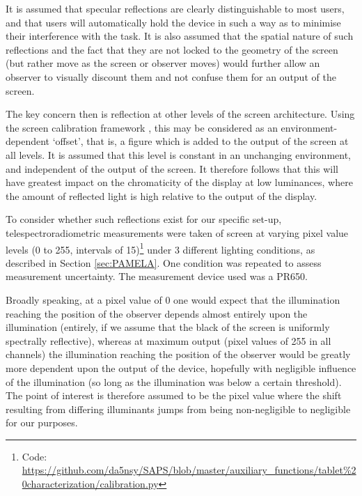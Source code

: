 It is assumed that specular reflections are clearly distinguishable to most users, and that users will automatically hold the device in such a way as to minimise their interference with the task. It is also assumed that the spatial nature of such reflections and the fact that they are not locked to the geometry of the screen (but rather move as the screen or observer moves) would further allow an observer to visually discount them and not confuse them for an output of the screen.

The key concern then is reflection at other levels of the screen architecture. Using the screen calibration framework \cite{berns_crt_1993}, this may be considered as an environment-dependent `offset', that is, a figure which is added to the output of the screen at all levels. It is assumed that this level is constant in an unchanging environment, and independent of the output of the screen. It therefore follows that this will have greatest impact on the chromaticity of the display at low luminances, where the amount of reflected light is high relative to the output of the display.

To consider whether such reflections exist for our specific set-up, telespectroradiometric measurements were taken of screen at varying pixel value levels (0 to 255, intervals of 15)\footnote{Code: \url{https://github.com/da5nsy/SAPS/blob/master/auxiliary_functions/tablet\%20characterization/calibration.py}} under 3 different lighting conditions, as described in Section \ref{sec:PAMELA}. One condition was repeated to assess measurement uncertainty. The measurement device used was a \gls{PR650}. 

Broadly speaking, at a pixel value of 0 one would expect that the illumination reaching the position of the observer depends almost entirely upon the illumination (entirely, if we assume that the black of the screen is uniformly spectrally reflective), whereas at maximum output (pixel values of 255 in all channels) the illumination reaching the position of the observer would be greatly more dependent upon the output of the device, hopefully with negligible influence of the illumination (so long as the illumination was below a certain threshold). The point of interest is therefore assumed to be the pixel value where the shift resulting from differing illuminants jumps from being non-negligible to negligible for our purposes.

